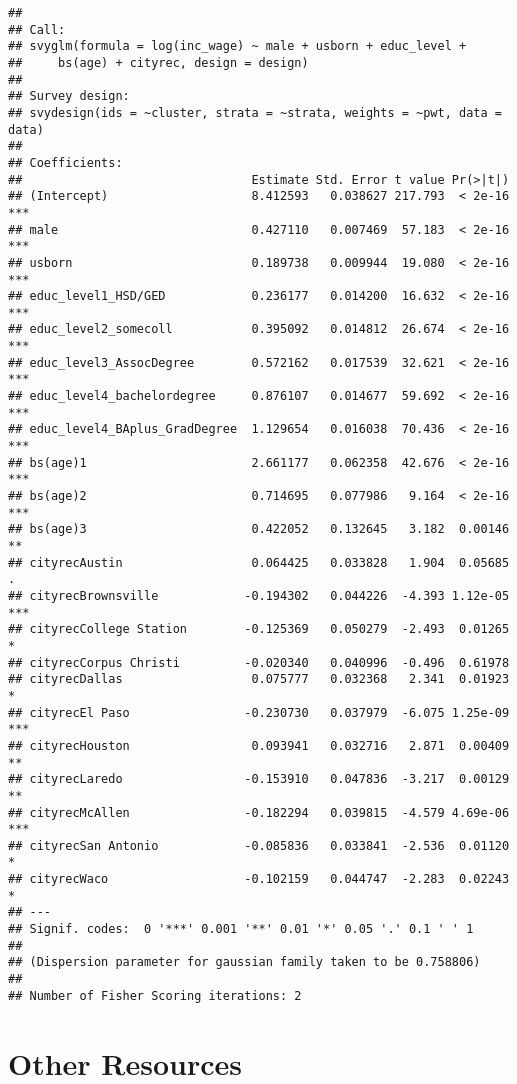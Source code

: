 \documentclass[]{article}
\begin{document}
\begin{verbatim}
## 
## Call:
## svyglm(formula = log(inc_wage) ~ male + usborn + educ_level + 
##     bs(age) + cityrec, design = design)
## 
## Survey design:
## svydesign(ids = ~cluster, strata = ~strata, weights = ~pwt, data = data)
## 
## Coefficients:
##                                Estimate Std. Error t value Pr(>|t|)    
## (Intercept)                    8.412593   0.038627 217.793  < 2e-16 ***
## male                           0.427110   0.007469  57.183  < 2e-16 ***
## usborn                         0.189738   0.009944  19.080  < 2e-16 ***
## educ_level1_HSD/GED            0.236177   0.014200  16.632  < 2e-16 ***
## educ_level2_somecoll           0.395092   0.014812  26.674  < 2e-16 ***
## educ_level3_AssocDegree        0.572162   0.017539  32.621  < 2e-16 ***
## educ_level4_bachelordegree     0.876107   0.014677  59.692  < 2e-16 ***
## educ_level4_BAplus_GradDegree  1.129654   0.016038  70.436  < 2e-16 ***
## bs(age)1                       2.661177   0.062358  42.676  < 2e-16 ***
## bs(age)2                       0.714695   0.077986   9.164  < 2e-16 ***
## bs(age)3                       0.422052   0.132645   3.182  0.00146 ** 
## cityrecAustin                  0.064425   0.033828   1.904  0.05685 .  
## cityrecBrownsville            -0.194302   0.044226  -4.393 1.12e-05 ***
## cityrecCollege Station        -0.125369   0.050279  -2.493  0.01265 *  
## cityrecCorpus Christi         -0.020340   0.040996  -0.496  0.61978    
## cityrecDallas                  0.075777   0.032368   2.341  0.01923 *  
## cityrecEl Paso                -0.230730   0.037979  -6.075 1.25e-09 ***
## cityrecHouston                 0.093941   0.032716   2.871  0.00409 ** 
## cityrecLaredo                 -0.153910   0.047836  -3.217  0.00129 ** 
## cityrecMcAllen                -0.182294   0.039815  -4.579 4.69e-06 ***
## cityrecSan Antonio            -0.085836   0.033841  -2.536  0.01120 *  
## cityrecWaco                   -0.102159   0.044747  -2.283  0.02243 *  
## ---
## Signif. codes:  0 '***' 0.001 '**' 0.01 '*' 0.05 '.' 0.1 ' ' 1
## 
## (Dispersion parameter for gaussian family taken to be 0.758806)
## 
## Number of Fisher Scoring iterations: 2
\end{verbatim}

\newpage

\section{Other Resources}\label{other-resources}
\end{document}
